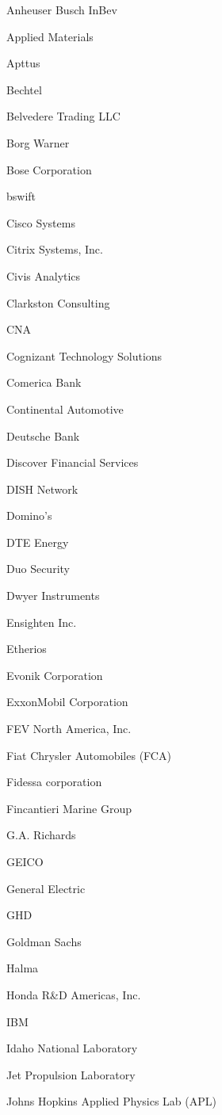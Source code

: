 \documentclass[twoside]{article}
\begin{document}
\begin{center}
\begin{multicols}{5}
\begin{FlushLeft}
\begin{compactitem}
\item Anheuser Busch InBev
\item Applied Materials
\item Apttus
\item Bechtel
\item Belvedere Trading LLC
\item Borg Warner
\item Bose Corporation
\item bswift
\item Cisco Systems
\item Citrix Systems, Inc.
\item Civis Analytics
\item Clarkston Consulting
\item CNA
\item Cognizant Technology Solutions
\item Comerica Bank
\item Continental Automotive
\item Deutsche Bank
\item Discover Financial Services
\item DISH Network
\item Domino's
\item DTE Energy
\item Duo Security
\item Dwyer Instruments
\item Ensighten Inc.
\item Etherios
\item Evonik Corporation
\item ExxonMobil Corporation
\item FEV North America, Inc.
\item Fiat Chrysler Automobiles (FCA)
\item Fidessa corporation
\item Fincantieri Marine Group
\item G.A. Richards
\item GEICO
\item General Electric
\item GHD
\item Goldman Sachs
\item Halma
\item Honda R\&D Americas, Inc.
\item IBM
\item Idaho National Laboratory
\item Jet Propulsion Laboratory
\item Johns Hopkins Applied Physics Lab (APL)

\end{compactitem}
\end{FlushLeft}
\end{multicols}
\end{center}
\end{document}
